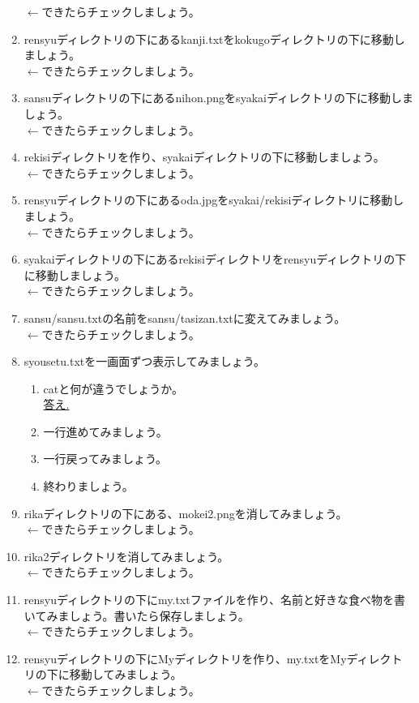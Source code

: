 \begin{tcolorbox}[title=\useOmetoi,breakable]
\begin{enumerate}
\fbox{\phantom{白}} $\leftarrow$できたらチェックしましょう。
\item rensyuディレクトリの下にあるkanji.txtをkokugoディレクトリの下に移動しましょう。\\
\fbox{\phantom{白}} $\leftarrow$できたらチェックしましょう。
\item sansuディレクトリの下にあるnihon.pngをsyakaiディレクトリの下に移動しましょう。\\
\fbox{\phantom{白}} $\leftarrow$できたらチェックしましょう。
\item rekisiディレクトリを作り、syakaiディレクトリの下に移動しましょう。\\
\fbox{\phantom{白}} $\leftarrow$できたらチェックしましょう。
\item rensyuディレクトリの下にあるoda.jpgをsyakai/rekisiディレクトリに移動しましょう。\\
\fbox{\phantom{白}} $\leftarrow$できたらチェックしましょう。
\item syakaiディレクトリの下にあるrekisiディレクトリをrensyuディレクトリの下に移動しましょう。\\
\fbox{\phantom{白}} $\leftarrow$できたらチェックしましょう。
\item sansu/sansu.txtの名前をsansu/tasizan.txtに変えてみましょう。\\
\fbox{\phantom{白}} $\leftarrow$できたらチェックしましょう。
\item syousetu.txtを一画面ずつ表示してみましょう。
	\begin{enumerate}
	\item catと何が違うでしょうか。\\
	\underline{答え.\hspace{0.8\linewidth}}
	\item 一行進めてみましょう。
	\item 一行戻ってみましょう。
	\item 終わりましょう。
	\end{enumerate}
\item rikaディレクトリの下にある、mokei2.pngを消してみましょう。\\
\fbox{\phantom{白}} $\leftarrow$できたらチェックしましょう。
\item rika2ディレクトリを消してみましょう。\\
\fbox{\phantom{白}} $\leftarrow$できたらチェックしましょう。
\item rensyuディレクトリの下にmy.txtファイルを作り、名前と好きな食べ物を書いてみましょう。書いたら保存しましょう。\\
\fbox{\phantom{白}} $\leftarrow$できたらチェックしましょう。
\item rensyuディレクトリの下にMyディレクトリを作り、my.txtをMyディレクトリの下に移動してみましょう。\\
\fbox{\phantom{白}} $\leftarrow$できたらチェックしましょう。
\end{enumerate}
\end{tcolorbox}
